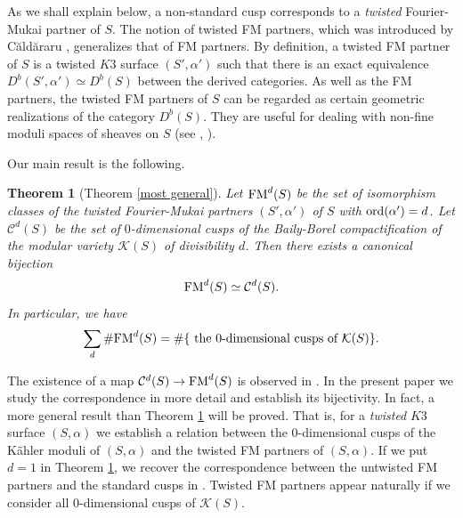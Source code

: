 \documentclass{article}
\theoremstyle{plain}
\newtheorem{theorem}{Theorem}[section]
\theoremstyle{definition}
\theoremstyle{remark}
\begin{document}
As we shall explain below, 
a non-standard cusp corresponds to 
a {\it twisted\/} Fourier-Mukai partner of $S$. 
The notion of twisted FM partners, 
which was introduced by C\u ald\u araru \cite{Ca1}, 
generalizes that of FM partners. 
By definition, 
a twisted FM partner of $S$ 
is a twisted $K3$ surface $(S', \alpha ')$ such that 
there is an exact equivalence 
$D^{b}(S', \alpha ') \simeq D^{b}(S)$ 
between the derived categories. 
As well as the FM partners, 
the twisted FM partners of $S$ can be regarded as 
certain geometric realizations of 
the category $D^{b}(S)$. 
They are useful for dealing with non-fine moduli spaces of sheaves on $S$ (see \cite{Ca2}, \cite{H-S1}). 







Our main result is the following. 








\begin{theorem}[Theorem \ref{most general}]\label{main1}
Let 
${\rm FM\/}^{d}(S) $ 
be the set of 
isomorphism classes of 
the twisted Fourier-Mukai partners $(S', \alpha ')$ of $S$ with ${\rm ord\/}(\alpha ')=d$.  
Let 
$\mathcal{C}^{d}(S)$ 
be the set of $0$-dimensional cusps of 
the Baily-Borel compactification of 
the modular variety  
$\mathcal{K} (S)$ 
of divisibility $d$. 
Then 
there exists a canonical bijection  
\begin{equation*}
{\rm FM\/}^{d}(S) 
 \simeq
\mathcal{C}^{d}(S). 
\end{equation*}
In particular,  we have 
\begin{equation*}
 \sum_{d} \# {\rm FM\/}^{d}(S) = 
\# \{ \text{ the 0-dimensional cusps of }  \mathcal{K} (S) \} . 
\end{equation*}
\end{theorem} 



 
The existence of a map 
$\mathcal{C}^{d}(S) \to {\rm FM\/}^{d}(S)$ 
is observed in \cite{Ma1}. 
In the present paper 
we study the correspondence in more detail  
and establish its bijectivity.   
In fact,   
a more general result than Theorem \ref{main1}  will be proved.   
That is,  
for a {\it twisted\/} $K3$ surface $(S, \alpha )$  
we establish a relation between 
the $0$-dimensional cusps of the K\"ahler moduli of $(S, \alpha )$  
and the twisted FM partners of $(S, \alpha )$.    
If we put $d=1$ in Theorem \ref{main1}, 
we recover the correspondence between 
the untwisted FM partners 
and 
the standard cusps 
in \cite{Ma1}. 
Twisted FM partners appear naturally  
if we consider all $0$-dimensional cusps of $\mathcal{K} (S)$. 
\end{document}
